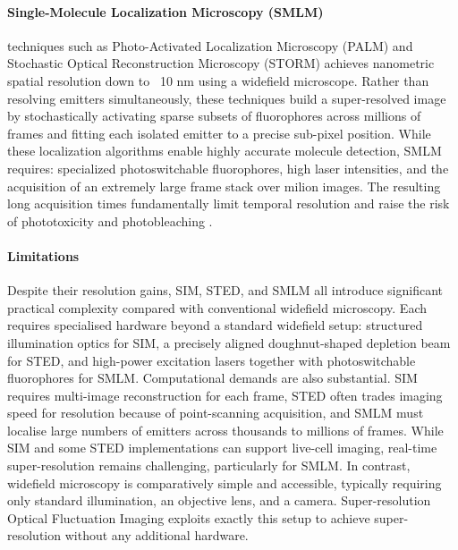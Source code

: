 \paragraph{Single-Molecule Localization Microscopy (SMLM)} techniques such as 
Photo-Activated Localization Microscopy (PALM) \cite{betzig_2006_imaging} and Stochastic Optical 
Reconstruction Microscopy (STORM) \cite{rust_2006_subdiffractionlimit}
achieves nanometric spatial resolution down to ~10 nm using a widefield microscope. Rather
  than resolving emitters simultaneously, these techniques build a super-resolved image by
stochastically activating sparse subsets of fluorophores across millions of frames and
fitting each isolated emitter to a precise sub-pixel position. While these localization algorithms 
enable highly accurate molecule detection, SMLM requires: specialized photoswitchable fluorophores, 
high laser intensities, and the acquisition of an extremely large frame stack over milion images. The resulting long
acquisition times fundamentally limit temporal resolution and raise the risk of phototoxicity and photobleaching \cite{smlm2018}.

\paragraph{Limitations}
Despite their resolution gains, SIM, STED, and SMLM all introduce significant practical 
complexity compared with conventional widefield microscopy. 
Each requires specialised hardware beyond a standard widefield setup: 
structured illumination optics for SIM, 
a precisely aligned doughnut-shaped depletion beam for STED, 
and high-power excitation lasers together with photoswitchable fluorophores for SMLM. 
Computational demands are also substantial. 
SIM requires multi-image reconstruction for each frame, 
STED often trades imaging speed for resolution because of point-scanning acquisition, 
and SMLM must localise large numbers of emitters across thousands to millions of frames. 
While SIM and some STED implementations can support live-cell imaging, 
real-time super-resolution remains challenging, particularly for SMLM. 
In contrast, widefield microscopy is comparatively simple and accessible, 
typically requiring only standard illumination, an objective lens, and a camera.
Super-resolution Optical Fluctuation Imaging exploits exactly this setup to achieve super-resolution without any additional hardware.

